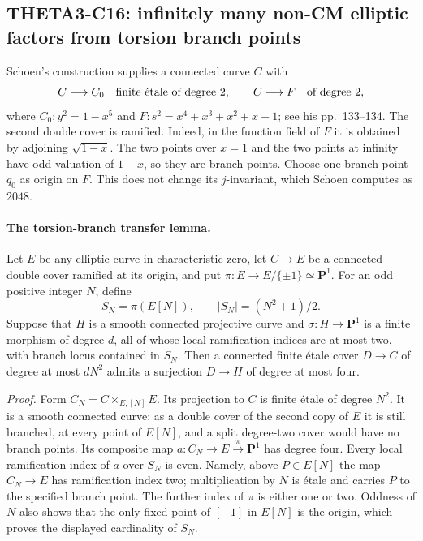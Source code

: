 \documentclass[11pt]{article}
\theoremstyle{definition}\newtheorem{definition}[theorem]{Definition}\newtheorem{remark}[theorem]{Remark}
\begin{document}
\subsection{THETA3-C16: infinitely many non-CM elliptic factors from torsion branch points}
\label{C16}

Schoen's construction supplies a connected curve $C$ with
\[
 C\longrightarrow C_0 \quad\hbox{finite \'{e}tale of degree }2,
 \qquad C\longrightarrow F \quad\hbox{of degree }2,
\]
where $C_0:y^2=1-x^5$ and
$F:s^2=x^4+x^3+x^2+x+1$; see his pp.~133--134.  The second double cover
is ramified.  Indeed, in the function field of $F$ it is obtained by
adjoining $\sqrt{1-x}$.  The two points over $x=1$ and the two points at
infinity have odd valuation of $1-x$, so they are branch points.
Choose one branch point $q_0$ as origin on $F$.  This does not change its
$j$-invariant, which Schoen computes as $2048$.

\paragraph{The torsion-branch transfer lemma.}
Let $E$ be any elliptic curve in characteristic zero, let $C\to E$ be a
connected double cover ramified at its origin, and put
$\pi:E\to E/\{\pm1\}\simeq\mathbf P^1$.  For an odd positive integer
$N$, define
\[
 S_N=\pi(E[N]),\qquad |S_N|=(N^2+1)/2.
\]
Suppose that $H$ is a smooth connected projective curve and
$\sigma:H\to\mathbf P^1$ is a finite morphism of degree $d$, all of whose
local ramification indices are at most two, with branch locus contained
in $S_N$.  Then a connected finite \'{e}tale cover $D\to C$ of degree
at most $dN^2$ admits a surjection $D\to H$ of degree at most four.

\emph{Proof.}
Form $C_N=C\times_{E,[N]}E$.  Its projection to $C$ is finite \'{e}tale
of degree $N^2$.  It is a smooth connected curve: as a double cover of
the second copy of $E$ it is still branched, at every point of $E[N]$,
and a split degree-two cover would have no branch points.  Its composite
map $a:C_N\to E\xrightarrow{\pi}\mathbf P^1$ has degree four.
Every local ramification index of $a$ over $S_N$ is even.  Namely, above
$P\in E[N]$ the map $C_N\to E$ has ramification index two; multiplication
by $N$ is \'{e}tale and carries $P$ to the specified branch point.
The further index of $\pi$ is either one or two.  Oddness of $N$ also
shows that the only fixed point of $[-1]$ in $E[N]$ is the origin,
which proves the displayed cardinality of $S_N$.
\end{document}
